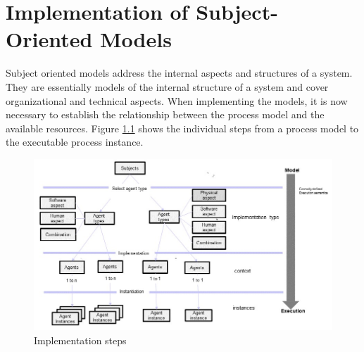 
%





\chapter{Implementation of Subject-Oriented Models}



Subject oriented models address the internal aspects and structures of a system. They are essentially models of the internal structure of a system and cover organizational and technical aspects. When implementing the models, it is now necessary to establish the relationship between the process model and the available resources. Figure \ref{fig:Implementation-steps} shows the individual steps from a process model to the executable process instance.

\begin{figure}[h]
	\centering
	\includegraphics[width=0.9\linewidth]{Figures/Implementation/Implementation-steps.jpg}
	\caption[Implementation steps]{Implementation steps}
	\label{fig:Implementation-steps}
\end{figure}

